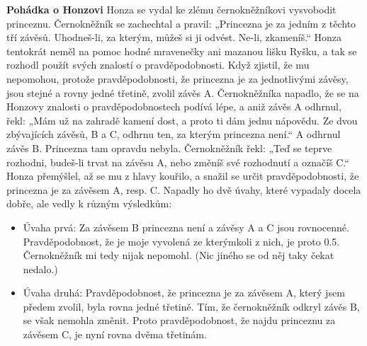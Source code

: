 \wikitextrule
\begin{example}\label{mai:exam062}
  \textbf{Pohádka o Honzovi}\newline\small
  Honza se vydal ke zlému černokněžníkovi vysvobodit princeznu. Černokněžník se zachechtal a 
  pravil: „Princezna je za jedním z těchto tří závěsů. Uhodneš-li, za kterým, můžeš si ji odvést. 
  Ne-li, zkameníš.“ Honza tentokrát neměl na pomoc hodné mravenečky ani mazanou lišku Ryšku, a tak 
  se rozhodl použít svých znalostí o pravděpodobnosti. Když zjistil, že mu nepomohou, protože 
  pravděpodobnosti, že princezna je za jednotlivými závěsy, jsou stejné a rovny jedné třetině, 
  zvolil závěs A. Černokněžníka napadlo, že se na Honzovy znalosti o pravděpodobnostech podívá 
  lépe, a aniž závěs A odhrnul, řekl: „Mám už na zahradě kamení dost, a proto ti dám jednu 
  nápovědu. Ze dvou zbývajících závěsů, B a C, odhrnu ten, za kterým princezna není.“ A odhrnul 
  závěs B. Princezna tam opravdu nebyla. Černokněžník řekl: „Teď se teprve rozhodni, budeš-li trvat 
  na závěsu A, nebo změníš své rozhodnutí a označíš C.“ Honza přemýšlel, až se mu z hlavy kouřilo, 
  a snažil se určit pravděpodobnosti, že princezna je za závěsem A, resp. C. Napadly ho dvě úvahy, 
  které vypadaly docela dobře, ale vedly k různým výsledkům:
  \begin{itemize}
  \item Úvaha prvá: Za závěsem B princezna není a závěsy A a C jsou rovnocenné. Pravděpodobnost, že 
        je moje vyvolená ze kterýmkoli z nich, je proto \num{0.5}. Černokněžník mi tedy nijak 
        nepomohl. (Nic jiného se od něj taky čekat nedalo.)
  \item Úvaha druhá: Pravděpodobnost, že princezna je za závěsem A, který jsem předem zvolil, byla 
        rovna jedné třetině. Tím, že černokněžník odkryl závěs B, se však nemohla změnit. Proto 
        pravděpodobnost, že najdu princeznu za závěsem C, je nyní rovna dvěma třetinám.
  \end{itemize}
  

\end{example}
